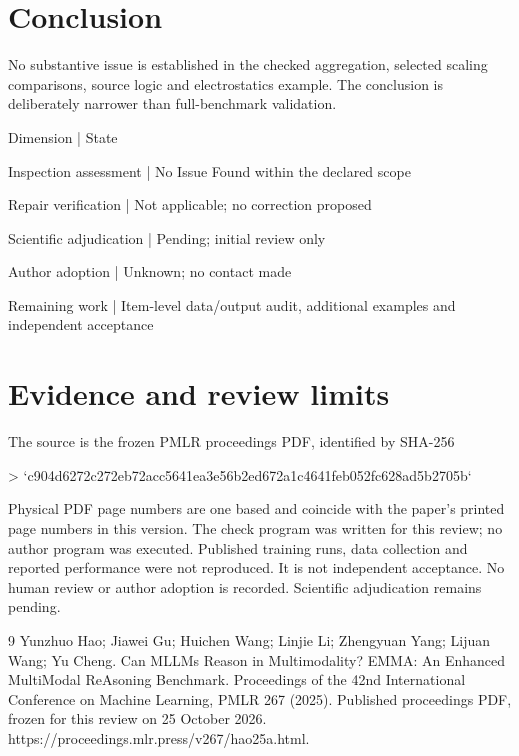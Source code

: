 \documentclass[10pt]{article}
\begin{document}
\section*{Conclusion}
No substantive issue is established in the checked aggregation, selected scaling comparisons, source logic and electrostatics example. The conclusion is deliberately narrower than full-benchmark validation.\par
Dimension | State\par
Inspection assessment | No Issue Found within the declared scope\par
Repair verification | Not applicable; no correction proposed\par
Scientific adjudication | Pending; initial review only\par
Author adoption | Unknown; no contact made\par
Remaining work | Item-level data/output audit, additional examples and independent acceptance\par
\section*{Evidence and review limits}
The source is the frozen PMLR proceedings PDF, identified by SHA-256\par
> `c904d6272c272eb72acc5641ea3e56b2ed672a1c4641feb052fc628ad5b2705b`\par
Physical PDF page numbers are one based and coincide with the paper’s printed page numbers in this version. The check program was written for this review; no author program was executed. Published training runs, data collection and reported performance were not reproduced. It is not independent acceptance. No human review or author adoption is recorded. Scientific adjudication remains pending.\par
9 Yunzhuo Hao; Jiawei Gu; Huichen Wang; Linjie Li; Zhengyuan Yang; Lijuan Wang; Yu Cheng. Can MLLMs Reason in Multimodality? EMMA: An Enhanced MultiModal ReAsoning Benchmark. Proceedings of the 42nd International Conference on Machine Learning, PMLR 267 (2025). Published proceedings PDF, frozen for this review on 25 October 2026. https://proceedings.mlr.press/v267/hao25a.html.\par
\end{document}
